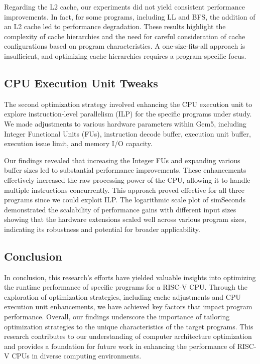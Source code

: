 \documentclass[
	article,			%
	11pt,				%
	oneside,			%
	a4paper,			%
	brazil,				%
        english,			%
	sumario=tradicional
	]{abntex2}
\begin{document}
Regarding the L2 cache, our experiments did not yield consistent performance improvements. In fact, for some programs, including LL and BFS, the addition of an L2 cache led to performance degradation. These results highlight the complexity of cache hierarchies and the need for careful consideration of cache configurations based on program characteristics. A one-size-fits-all approach is insufficient, and optimizing cache hierarchies requires a program-specific focus.

\subsection{CPU Execution Unit Tweaks} 
The second optimization strategy involved enhancing the CPU execution unit to explore instruction-level parallelism (ILP) for the specific programs under study. We made adjustments to various hardware parameters within Gem5, including Integer Functional Units (FUs), instruction decode buffer, execution unit buffer, execution issue limit, and memory I/O capacity.

Our findings revealed that increasing the Integer FUs and expanding various buffer sizes led to substantial performance improvements. These enhancements effectively increased the raw processing power of the CPU, allowing it to handle multiple instructions concurrently. This approach proved effective for all three programs since we could exploit ILP. The logarithmic scale plot of simSeconds demonstrated the scalability of performance gains with different input sizes showing that the hardware extensions scaled well across various program sizes, indicating its robustness and potential for broader applicability.

\subsection{Conclusion}
In conclusion, this research's efforts have yielded valuable insights into optimizing the runtime performance of specific programs for a RISC-V CPU. Through the exploration of optimization strategies, including cache adjustments and CPU execution unit enhancements, we have achieved key factors that impact program performance. Overall, our findings underscore the importance of tailoring optimization strategies to the unique characteristics of the target programs. This research contributes to our understanding of computer architecture optimization and provides a foundation for future work in enhancing the performance of RISC-V CPUs in diverse computing environments.


\end{document}
